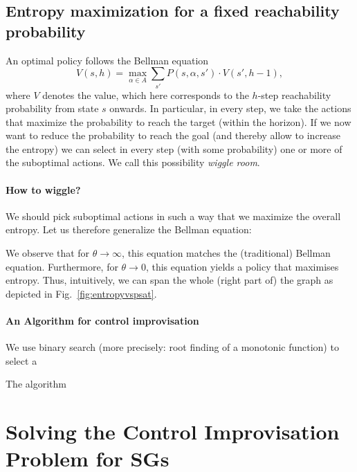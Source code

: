\documentclass[conference]{IEEEtran}
\theoremstyle{remark}
\newcommand{\act}{\alpha}
\newcommand{\Act}{A}
\begin{document}
\subsection{Entropy maximization for a fixed reachability probability}

An optimal policy follows the Bellman equation
\[ V(s,h)  = \max_{\act \in \Act} \sum_{s'} P(s,\act,s') \cdot V(s',h-1),\]
where $V$ denotes the value, which here corresponds to the $h$-step reachability probability from state $s$ onwards.
In particular, in every step, we take the actions that maximize the probability to reach the target (within the horizon). 
If we now want to reduce the probability to reach the goal (and thereby allow to increase the entropy) we can select in every step (with some probability) one or more of the suboptimal actions. We call this possibility \emph{wiggle room}. 
\paragraph{How to wiggle?}
We should pick suboptimal actions in such a way that we maximize the overall entropy. Let us therefore generalize the Bellman equation:

We observe that for $\theta \rightarrow \infty$, this equation matches the (traditional) Bellman equation. 
Furthermore, for $\theta \rightarrow 0$, this equation yields a policy that maximises entropy.
Thus, intuitively, we can span the whole (right part of) the graph as depicted in Fig.~\ref{fig:entropyvspsat}.


\paragraph{An Algorithm for control improvisation}

We use binary search (more precisely: root finding of a monotonic function) to select a 

The algorithm 




 

\section{Solving the Control Improvisation Problem for SGs}
\end{document}
